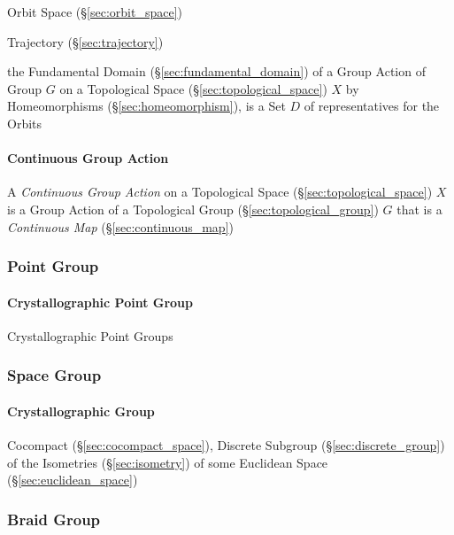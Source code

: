 \fist Orbit Space (\S\ref{sec:orbit_space})

\fist Trajectory (\S\ref{sec:trajectory})

the Fundamental Domain (\S\ref{sec:fundamental_domain}) of a Group Action of
Group $G$ on a Topological Space (\S\ref{sec:topological_space}) $X$ by
Homeomorphisms (\S\ref{sec:homeomorphism}), is a Set $D$ of representatives for
the Orbits



\paragraph{Continuous Group Action}\label{sec:continuous_group_action}

A \emph{Continuous Group Action} on a Topological Space
(\S\ref{sec:topological_space}) $X$ is a Group Action of a Topological Group
(\S\ref{sec:topological_group}) $G$ that is a \emph{Continuous Map}
(\S\ref{sec:continuous_map})



\subsubsection{Point Group}\label{sec:point_group}

\paragraph{Crystallographic Point Group}\label{sec:crystallographic_point_group}
\hfill

Crystallographic Point Groups



\subsubsection{Space Group}\label{sec:space_group}

\paragraph{Crystallographic Group}\label{sec:crystallographic_group}\hfill

Cocompact (\S\ref{sec:cocompact_space}), Discrete Subgroup
(\S\ref{sec:discrete_group}) of the Isometries (\S\ref{sec:isometry}) of some
Euclidean Space (\S\ref{sec:euclidean_space})



\subsubsection{Braid Group}\label{sec:braid_group}

